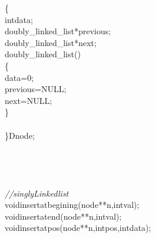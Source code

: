 \documentclass[a4paper, 9pt]{article}
\newcommand\SPC{\hspace*{0.6em}}
\newcommand\TAB{\hspace*{1.2em}}
\newcommand{\CppAComment}[1]{\textit{\textcolor[rgb]{0.4,0.45,0.48}{#1}}}
\newcommand{\CppAIdentifier}[1]{\textcolor[rgb]{0.88,0.89,0.89}{#1}}
\newcommand{\CppANumber}[1]{\textcolor[rgb]{1,0.8,0.13}{#1}}
\newcommand{\CppAReservedWord}[1]{\textcolor[rgb]{0.4,0.55,0.69}{#1}}
\newcommand{\CppASpace}[1]{\colorbox[rgb]{0.16,0.19,0.2}{#1}}
\newcommand{\CppASymbol}[1]{\textcolor[rgb]{0.91,0.89,0.72}{#1}}
\begin{document}
\begin{ttfamily}
\CppASymbol{\{}\\
\CppASpace{\TAB }\CppAReservedWord{int}\CppASpace{\SPC }\CppAIdentifier{data}\CppASymbol{;}\\
\CppASpace{\TAB }\CppAIdentifier{doubly\_linked\_list}\CppASpace{\SPC }\CppASymbol{*}\CppAIdentifier{previous}\CppASymbol{;}\\
\CppASpace{\TAB }\CppAIdentifier{doubly\_linked\_list}\CppASymbol{*}\CppASpace{\SPC }\CppAIdentifier{next}\CppASymbol{;}\\
\CppASpace{\TAB }\CppAIdentifier{doubly\_linked\_list}\CppASymbol{(}\CppASymbol{)}\\
\CppASpace{\TAB }\CppASymbol{\{}\\
\CppASpace{\TAB \TAB }\CppAIdentifier{data}\CppASpace{\SPC }\CppASymbol{=}\CppASpace{\SPC }\CppANumber{0}\CppASymbol{;}\\
\CppASpace{\TAB \TAB }\CppAIdentifier{previous}\CppASpace{\SPC }\CppASymbol{=}\CppASpace{\SPC }\CppAIdentifier{NULL}\CppASymbol{;}\\
\CppASpace{\TAB \TAB }\CppAIdentifier{next}\CppASpace{\SPC }\CppASymbol{=}\CppASpace{\SPC }\CppAIdentifier{NULL}\CppASymbol{;}\\
\CppASpace{\TAB }\CppASymbol{\}}\\
\CppASpace{\TAB \TAB }\\
\CppASymbol{\}}\CppAIdentifier{Dnode}\CppASymbol{;}\\
\\
\\
\\
\\
\CppAComment{//singlyLinkedlist}\\
\CppAReservedWord{void}\CppASpace{\SPC }\CppAIdentifier{insertatbegining}\CppASymbol{(}\CppASpace{\SPC }\CppAIdentifier{node}\CppASymbol{*}\CppASymbol{*}\CppASpace{\SPC }\CppAIdentifier{n}\CppASymbol{,}\CppAReservedWord{int}\CppASpace{\SPC }\CppAIdentifier{val}\CppASymbol{)}\CppASymbol{;}\\
\CppAReservedWord{void}\CppASpace{\SPC }\CppAIdentifier{insertatend}\CppASymbol{(}\CppASpace{\SPC }\CppAIdentifier{node}\CppASymbol{*}\CppASymbol{*}\CppASpace{\SPC }\CppAIdentifier{n}\CppASymbol{,}\CppAReservedWord{int}\CppASpace{\SPC }\CppAIdentifier{val}\CppASymbol{)}\CppASymbol{;}\\
\CppAReservedWord{void}\CppASpace{\SPC }\CppAIdentifier{insertatpos}\CppASymbol{(}\CppAIdentifier{node}\CppASymbol{*}\CppASymbol{*}\CppASpace{\SPC }\CppAIdentifier{n}\CppASymbol{,}\CppAReservedWord{int}\CppASpace{\SPC }\CppAIdentifier{pos}\CppASymbol{,}\CppAReservedWord{int}\CppASpace{\SPC }\CppAIdentifier{data}\CppASymbol{)}\CppASymbol{;}\\

\end{ttfamily}
\end{document}
